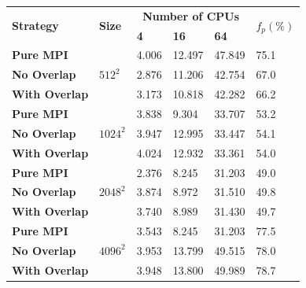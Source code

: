\begin{frame}
  \begin{center}
    \label{TAB:Benchmark:Weak_PURE_MPI}
    \footnotesize
    \begin{tabular}{p{3cm} p{1.5cm} p{1.5cm} p{1.5cm} p{1.5cm} p{1cm}}
      \toprule
      \multirow{2}{*}{\bfseries Strategy}     & \multirow{2}{*}{\bfseries Size} & \multicolumn{3}{c}{\bfseries Number of CPUs}   & \multirow{2}{*}{\bfseries $f_p(\%)$}  \\
                                    &                                  & \bfseries 4   & \bfseries 16   & \bfseries 64  &                                       \\
      \midrule
      \bfseries Pure MPI      & \multirow{3}{*}{$512^2$}      & 4.006  & 12.497  & 47.849                                         & 75.1 \\
      \bfseries No Overlap    &                               & 2.876  & 11.206  & 42.754                                         & 67.0 \\
      \bfseries With Overlap  &                               & 3.173  & 10.818  & 42.282                                         & 66.2 \\
      \midrule
      \bfseries Pure MPI      & \multirow{3}{*}{$1024^2$}     & 3.838  & 9.304   & 33.707                                         & 53.2  \\
      \bfseries No Overlap    &                               & 3.947  & 12.995  & 33.447                                         & 54.1 \\
      \bfseries With Overlap  &                               & 4.024  & 12.932  & 33.361                                         &  54.0 \\
      \midrule
      \bfseries Pure MPI      & \multirow{3}{*}{$2048^2$}     & 2.376  & 8.245   & 31.203                                         &  49.0\\
      \bfseries No Overlap    &                               & 3.874  & 8.972   & 31.510                                         &  49.8 \\
      \bfseries With Overlap  &                               & 3.740  & 8.989   & 31.430                                         &  49.7 \\
      \midrule
      \bfseries Pure MPI      & \multirow{3}{*}{$4096^2$}     & 3.543  & 8.245   & 31.203                                         &  77.5\\
      \bfseries No Overlap    &                               & 3.953  & 13.799  & 49.515                                         &  78.0\\
      \bfseries With Overlap  &                               & 3.948  & 13.800  & 49.989                                         &  78.7 \\
      \bottomrule
    \end{tabular}
  \end{center}
\end{frame}






